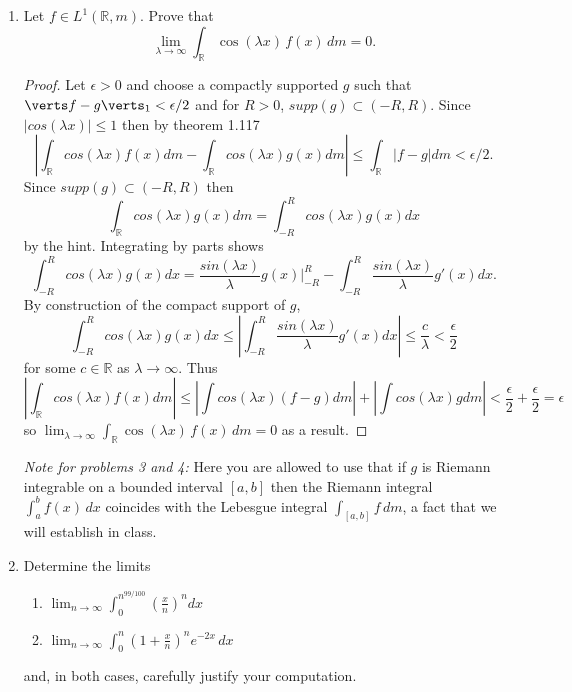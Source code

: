 \documentclass[11pt]{article}
\begin{document}
\begin{enumerate}[leftmargin=*, label=\textbf{\arabic*.}]
	\item Let $f \in L^1(\mathbb{R}, m)$. Prove that
	      \[
		      \lim_{\lambda \to \infty} \int_{\mathbb{R}} \cos(\lambda x)\, f(x)\, dm = 0.
	      \]
	      \begin{proof}
		      Let $\epsilon >0$ and choose a compactly supported $g$ such that
		      $\verts f - g\verts_1 < \epsilon/2$ and for $R >0$, $supp(g) \subset (-R, R)$. Since $|cos(\lambda x)| \leq 1$ then by theorem 1.117
		      $$| \int_\mathbb{R} cos(\lambda x)f(x)dm - \int_\mathbb{R} cos(\lambda x)g(x) dm | \leq \int_\mathbb{R} |f-g|dm < \epsilon/2.$$
		      Since $supp(g) \subset (-R,R)$ then
		      $$\int_\mathbb{R} cos(\lambda x)g(x)dm = \int_{-R}^R cos(\lambda x)g(x) dx$$ by the hint. Integrating by parts shows
		      $$\int_{-R}^R cos(\lambda x)g(x)dx = \frac{sin(\lambda x)}{\lambda}g(x) \vert_{-R}^R - \int_{-R}^R \frac{sin(\lambda x)}{\lambda}g'(x)dx.$$ By construction of the compact support of $g$,
		      $$\int_{-R}^R cos(\lambda x)g(x)dx \leq |\int_{-R}^R \frac{sin(\lambda x)}{\lambda}g'(x)dx | \leq \frac{c}{\lambda} < \frac{\epsilon}{2}$$
		      for some $c \in \mathbb{R}$ as $\lambda \to \infty$. Thus
		      $$|\int_\mathbb{R} cos(\lambda x)f(x)dm| \leq |\int cos(\lambda x)(f-g)dm| + |\int cos(\lambda x)gdm| < \frac{\epsilon}{2} + \frac{\epsilon}{2} = \epsilon$$
		      so $\lim_{\lambda \to \infty} \int_{\mathbb{R}} \cos(\lambda x)\, f(x)\, dm = 0$ as a result.


	      \end{proof}

	      \medskip
	      \noindent\textit{Note for problems 3 and 4:} Here you are allowed to use that if $g$ is Riemann integrable on a bounded interval $[a,b]$ then the Riemann integral $\int_a^b f(x)\, dx$ coincides with the Lebesgue integral $\int_{[a,b]} f\, dm$, a fact that we will establish in class.

	\item Determine the limits
	      \begin{enumerate}[label=(\roman*)]
		      \item $\displaystyle\lim_{n\to\infty} \int_0^{n^{99/100}} \left(\frac{x}{n}\right)^n dx$

		      \item $\displaystyle\lim_{n\to\infty} \int_0^n \left(1 + \frac{x}{n}\right)^n e^{-2x}\, dx$
	      \end{enumerate}
	      and, in both cases, carefully justify your computation.


\end{enumerate}
\end{document}
